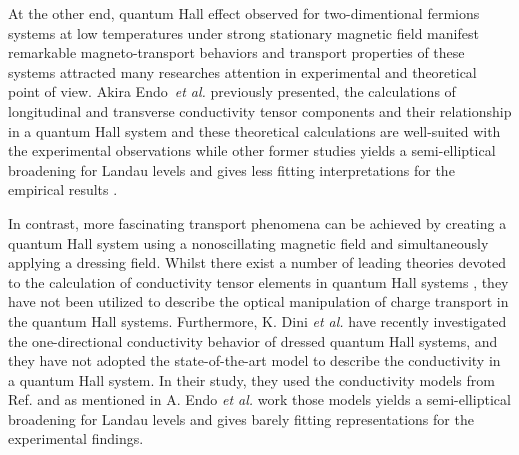 At the other end, quantum Hall effect \cite{girvin90} observed for two-dimentional fermions systems at low temperatures under strong stationary magnetic field manifest remarkable magneto-transport behaviors and transport properties of these systems attracted many researches attention in experimental \cite{allerman95,tieke97,pan05} and theoretical \cite{ando72,ando74_1,ando74_2,ando74_3,ando74_4,ando82,endo09} point of view.
Akira Endo \textit{et al.} \cite{endo09} previously presented, the calculations of longitudinal and transverse conductivity tensor components and their relationship in a quantum Hall system and these theoretical calculations are well-suited with the experimental observations while other former studies yields a semi-elliptical broadening for Landau levels and gives less fitting interpretations for the empirical results \cite{endo09}.

In contrast, more fascinating transport phenomena can be achieved by creating a quantum Hall system using a nonoscillating magnetic field and simultaneously applying a dressing field.
Whilst there exist a number of leading theories devoted to the calculation of conductivity tensor elements in quantum Hall systems \cite{ando74_1,ando82,endo09}, they have not been utilized to describe the optical manipulation of charge transport in the quantum Hall systems.
Furthermore, K. Dini \textit{et al.} \cite{dini16} have recently investigated the one-directional conductivity behavior of dressed quantum Hall systems, and they have not adopted the state-of-the-art model to describe the conductivity in a quantum Hall system. In their study, they used the conductivity models from Ref. \cite{ando74_1,ando82} and as mentioned in A. Endo \textit{et al.} work \cite{endo09} those models yields a semi-elliptical broadening for Landau levels and gives barely fitting representations for the experimental findings.

